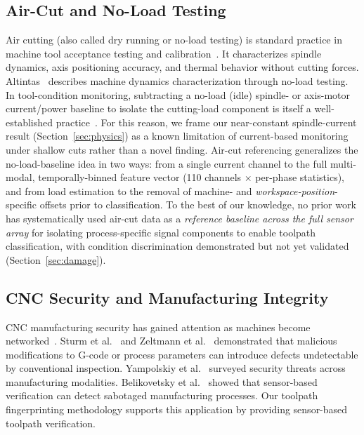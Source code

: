 \subsection{Air-Cut and No-Load Testing}

Air cutting (also called dry running or no-load testing) is standard practice in machine tool acceptance testing and calibration~\cite{iso230_2012}. It characterizes spindle dynamics, axis positioning accuracy, and thermal behavior without cutting forces. Altintas~\cite{altintas2012manufacturing} describes machine dynamics characterization through no-load testing. In tool-condition monitoring, subtracting a no-load (idle) spindle- or axis-motor current/power baseline to isolate the cutting-load component is itself a well-established practice~\cite{teti2010advanced, dimla2000sensor, byrne1995tool}. For this reason, we frame our near-constant spindle-current result (Section~\ref{sec:physics}) as a known limitation of current-based monitoring under shallow cuts rather than a novel finding. Air-cut referencing generalizes the no-load-baseline idea in two ways: from a single current channel to the full multi-modal, temporally-binned feature vector (110 channels $\times$ per-phase statistics), and from load estimation to the removal of machine- and \emph{workspace-position}-specific offsets prior to classification. To the best of our knowledge, no prior work has systematically used air-cut data as a \emph{reference baseline across the full sensor array} for isolating process-specific signal components to enable toolpath classification, with condition discrimination demonstrated but not yet validated (Section~\ref{sec:damage}).

\subsection{CNC Security and Manufacturing Integrity}

CNC manufacturing security has gained attention as machines become networked~\cite{monostori2016cyber}. Sturm et al.~\cite{sturm2017cyber} and Zeltmann et al.~\cite{zeltmann2016manufacturing} demonstrated that malicious modifications to G-code or process parameters can introduce defects undetectable by conventional inspection. Yampolskiy et al.~\cite{yampolskiy2018security} surveyed security threats across manufacturing modalities. Belikovetsky et al.~\cite{belikovetsky2017drowned} showed that sensor-based verification can detect sabotaged manufacturing processes. Our toolpath fingerprinting methodology supports this application by providing sensor-based toolpath verification.
